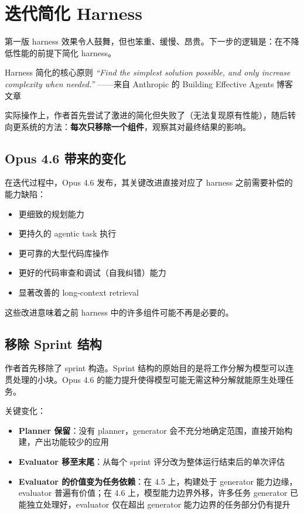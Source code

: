 \section{迭代简化 Harness}

第一版 harness 效果令人鼓舞，但也笨重、缓慢、昂贵。下一步的逻辑是：在不降低性能的前提下简化 harness。

\begin{importantbox}{Harness 简化的核心原则}
\textit{``Find the simplest solution possible, and only increase complexity when needed.''} ——来自 Anthropic 的 Building Effective Agents 博客文章

实际操作上，作者首先尝试了激进的简化但失败了（无法复现原有性能），随后转向更系统的方法：\textbf{每次只移除一个组件}，观察其对最终结果的影响。
\end{importantbox}

\subsection{Opus 4.6 带来的变化}

在迭代过程中，Opus 4.6 发布，其关键改进直接对应了 harness 之前需要补偿的能力缺陷：

\begin{itemize}
    \item 更细致的规划能力
    \item 更持久的 agentic task 执行
    \item 更可靠的大型代码库操作
    \item 更好的代码审查和调试（自我纠错）能力
    \item 显著改善的 long-context retrieval
\end{itemize}

这些改进意味着之前 harness 中的许多组件可能不再是必要的。

\subsection{移除 Sprint 结构}

作者首先移除了 sprint 构造。Sprint 结构的原始目的是将工作分解为模型可以连贯处理的小块。Opus 4.6 的能力提升使得模型可能无需这种分解就能原生处理任务。

关键变化：
\begin{itemize}
    \item \textbf{Planner 保留}：没有 planner，generator 会不充分地确定范围，直接开始构建，产出功能较少的应用
    \item \textbf{Evaluator 移至末尾}：从每个 sprint 评分改为整体运行结束后的单次评估
    \item \textbf{Evaluator 的价值变为任务依赖}：在 4.5 上，构建处于 generator 能力边缘，evaluator 普遍有价值；在 4.6 上，模型能力边界外移，许多任务 generator 已能独立处理好，evaluator 仅在超出 generator 能力边界的任务部分仍有提升
\end{itemize}

